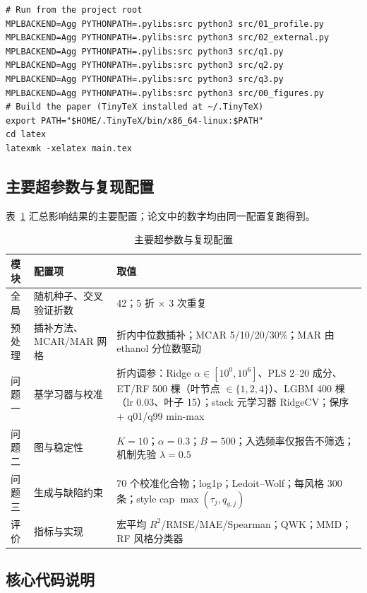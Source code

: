\begin{lstlisting}[style=shellcode,caption={复现命令},label={lst:pipeline}]
# Run from the project root
MPLBACKEND=Agg PYTHONPATH=.pylibs:src python3 src/01_profile.py
MPLBACKEND=Agg PYTHONPATH=.pylibs:src python3 src/02_external.py
MPLBACKEND=Agg PYTHONPATH=.pylibs:src python3 src/q1.py
MPLBACKEND=Agg PYTHONPATH=.pylibs:src python3 src/q2.py
MPLBACKEND=Agg PYTHONPATH=.pylibs:src python3 src/q3.py
MPLBACKEND=Agg PYTHONPATH=.pylibs:src python3 src/00_figures.py
# Build the paper (TinyTeX installed at ~/.TinyTeX)
export PATH="$HOME/.TinyTeX/bin/x86_64-linux:$PATH"
cd latex
latexmk -xelatex main.tex
\end{lstlisting}

\subsection{主要超参数与复现配置}

表~\ref{tab:appendix-config} 汇总影响结果的主要配置；论文中的数字均由同一配置复跑得到。

\begin{table}[htbp]
  \centering
  \caption{主要超参数与复现配置}
  \label{tab:appendix-config}
  \small
  \begin{tabularx}{\textwidth}{@{}l X X@{}}
    \toprule
    模块 & 配置项 & 取值 \\
    \midrule
    全局 & 随机种子、交叉验证折数 & 42；5 折 $\times$ 3 次重复 \\
    预处理 & 插补方法、MCAR/MAR 网格 & 折内中位数插补；MCAR 5/10/20/30\%；MAR 由 ethanol 分位数驱动 \\
    问题一 & 基学习器与校准 & 折内调参：Ridge $\alpha\in[10^0,10^6]$、PLS 2--20 成分、ET/RF 500 棵（叶节点 $\in\{1,2,4\}$）、LGBM 400 棵（lr 0.03、叶子 15）；stack 元学习器 RidgeCV；保序 + q01/q99 min-max \\
    问题二 & 图与稳定性 & $K=10$；$\alpha=0.3$；$B=500$；入选频率仅报告不筛选；机制先验 $\lambda=0.5$ \\
    问题三 & 生成与缺陷约束 & 70 个校准化合物；log1p；Ledoit--Wolf；每风格 300 条；style cap $\max(\tau_j,q_{g,j})$ \\
    评价 & 指标与实现 & 宏平均 $R^2$/RMSE/MAE/Spearman；QWK；MMD；RF 风格分类器 \\
    \bottomrule
  \end{tabularx}
\end{table}

\subsection{核心代码说明}

